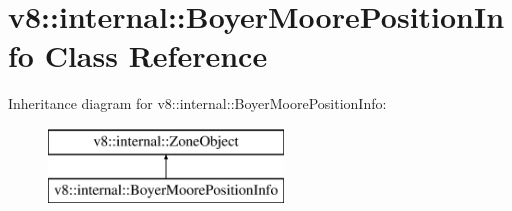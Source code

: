 \hypertarget{classv8_1_1internal_1_1_boyer_moore_position_info}{}\section{v8\+:\+:internal\+:\+:Boyer\+Moore\+Position\+Info Class Reference}
\label{classv8_1_1internal_1_1_boyer_moore_position_info}
Inheritance diagram for v8\+:\+:internal\+:\+:Boyer\+Moore\+Position\+Info\+:\begin{figure}[H]
\begin{center}
\leavevmode
\includegraphics[height=2.000000cm]{classv8_1_1internal_1_1_boyer_moore_position_info}
\end{center}
\end{figure}
